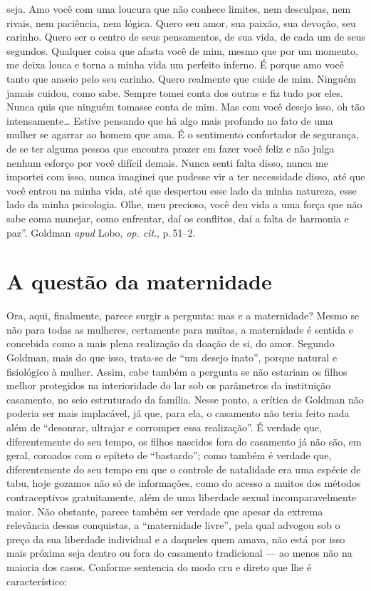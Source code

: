 {  seja. Amo você com uma loucura que não conhece limites, nem desculpas,
  nem rivais, nem paciência, nem lógica. Quero seu amor, sua paixão, sua
  devoção, seu carinho. Quero ser o centro de seus pensamentos, de sua
  vida, de cada um de seus segundos. Qualquer coisa que afasta você de
  mim, mesmo que por um momento, me deixa louca e torna a minha vida um
  perfeito inferno. É porque amo você tanto que anseio pelo seu carinho.
  Quero realmente que cuide de mim. Ninguém jamais cuidou, como sabe.
  Sempre tomei conta dos outras e fiz tudo por eles. Nunca quis que
  ninguém tomasse conta de mim. Mas com você desejo isso, oh tão
  intensamente\ldots{} Estive pensando que há algo mais profundo no fato de
  uma mulher se agarrar ao homem que ama. É o sentimento confortador de
  segurança, de se ter alguma pessoa que encontra prazer em fazer você
  feliz e não julga nenhum esforço por você difícil demais. Nunca senti
  falta disso, nunca me importei com isso, nunca imaginei que pudesse
  vir a ter necessidade disso, até que você entrou na minha vida, até
  que despertou esse lado da minha natureza, esse lado da minha
  psicologia. Olhe, meu precioso, você deu vida a uma força que não sabe
  coma manejar, como enfrentar, daí os conflitos, daí a falta de
  harmonia e paz''. Goldman \emph{apud} Lobo, \textit{op. cit}., p.\,51--2.}

\section{A questão da maternidade}

Ora, aqui, finalmente, parece surgir a pergunta: mas e a maternidade?
Mesmo se não para todas as mulheres, certamente para muitas, a
maternidade é sentida e concebida como a mais plena realização da doação
de si, do amor. Segundo Goldman, mais do que isso, trata-se de ``um
desejo inato'', porque natural e fisiológico à mulher. Assim, cabe
também a pergunta se não estariam os filhos melhor protegidos na
interioridade do lar sob os parâmetros da instituição casamento, no seio
estruturado da família. Nesse ponto, a crítica de Goldman não poderia
ser mais implacável, já que, para ela, o casamento não teria feito nada
além de ``desonrar, ultrajar e corromper essa realização''. É verdade
que, diferentemente do seu tempo, os filhos nascidos fora do casamento
já não são, em geral, coroados com o epíteto de ``bastardo''; como
também é verdade que, diferentemente do seu tempo em que o controle de
natalidade era uma espécie de tabu, hoje gozamos não só de informações,
como do acesso a muitos dos métodos contraceptivos gratuitamente, além
de uma liberdade sexual incomparavelmente maior. Não obstante, parece
também ser verdade que apesar da extrema relevância dessas conquistas, a
``maternidade livre'', pela qual advogou sob o preço da sua liberdade
individual e a daqueles quem amava, não está por isso mais próxima seja
dentro ou fora do casamento tradicional --- ao menos não na maioria dos
casos. Conforme sentencia do modo cru e direto que lhe é característico:

